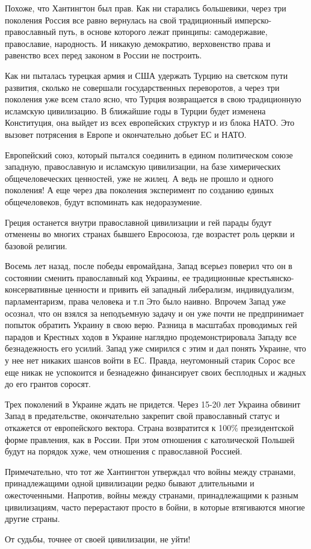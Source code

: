 Похоже, что Хантингтон был прав.  Как ни старались большевики, через три
поколения Россия все равно вернулась на свой традиционный имперско-
православный путь, в основе которого лежат принципы: самодержавие, православие,
народность. И никакую демократию, верховенство права и равенство всех перед
законом в России не построить.  

Как ни пыталась турецкая армия и США удержать Турцию на светском пути развития,
сколько не совершали государственных переворотов, а через три поколения уже
всем стало ясно, что Турция возвращается в свою традиционную исламскую
цивилизацию. В ближайшие годы в Турции будет изменена Конституция, она выйдет
из всех европейских структур и из блока НАТО. Это вызовет потрясения в Европе и
окончательно добьет ЕС и НАТО.  

Европейский союз, который пытался соединить в едином политическом союзе
западную, православную и исламскую цивилизации, на базе химерических
общечеловеческих ценностей, уже не жилец. А ведь не  прошло и одного
поколения! А еще через два поколения эксперимент по созданию единых
общечеловеков, будут вспоминать как недоразумение. 

Греция останется внутри православной цивилизации и гей парады будут отменены во
многих странах бывшего Евросоюза, где возрастет роль церкви и базовой религии.  

Восемь  лет   назад, после победы евромайдана,  Запад всерьез поверил что он в
состоянии сменить православный код Украины, ее традиционные
крестьянско-консервативные ценности  и привить ей западный либерализм,
индивидуализм, парламентаризм, права человека  и т.п  Это было наивно. Впрочем
Запад уже осознал,  что он взялся за неподъемную задачу и он уже почти не
предпринимает попыток обратить Украину в свою верю. Разница в масштабах
проводимых гей парадов и Крестных ходов в Украине наглядно продемонстрировала
Западу все безнадежность его усилий.  Запад уже смирился с этим и дал понять
Украине, что у нее нет никаких шансов войти в ЕС. Правда, неугомонный старик
Сорос все еще никак не успокоится и безнадежно финансирует  своих бесплодных и
жадных до его грантов соросят. 

Трех поколений  в Украине ждать не придется. Через 15-20  лет Украина  обвинит
Запад в предательстве, окончательно закрепит свой православный статус и
откажется от европейского вектора.   Страна возвратится к 100\% президентской
форме правления, как в  России. При этом отношения с католической Польшей
будут на порядок хуже, чем отношения с православной Россией. 

Примечательно, что тот же Хантингтон утверждал что войны между странами,
принадлежащими одной цивилизации редко бывают длительными и ожесточенными.
Напротив, войны между странами, принадлежащими  к разным цивилизациям, часто
перерастают просто в бойни, в которые втягиваются многие другие страны. 

От судьбы, точнее от своей цивилизации, не уйти!

